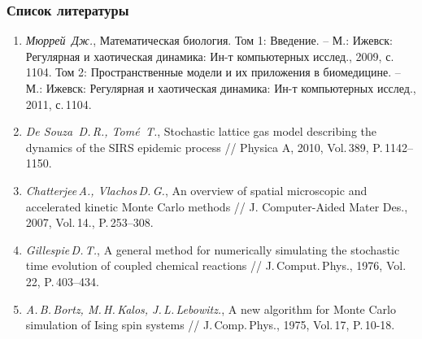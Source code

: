 \documentclass[
    11pt, %
    aspectratio=169, %
]{beamer}
\begin{document}
\begin{frame}
	\frametitle{Список литературы}
		
    \fontsize{10}{10}\selectfont{}

    \begin{enumerate}
        \item \textit{Мюррей \,Дж.}, Математическая биология. Том 1: Введение. – М.: Ижевск: Регулярная и хаотическая динамика: Ин-т компьютерных исслед., 2009, с.\,1104. Том 2: Пространственные модели и их приложения в биомедицине. – М.: Ижевск: Регулярная и хаотическая динамика: Ин-т компьютерных исслед., 2011, с.\,1104.
        \item \textit{De Souza \,D.\,R., Tomé \,T.}, Stochastic lattice gas model describing the dynamics of the SIRS epidemic process // Physica A, 2010, Vol.\,389, P.\,1142–1150.
        \item  \textit{Chatterjee\,A., Vlachos\,D.\,G.}, An overview of spatial microscopic and accelerated kinetic Monte Carlo methods // J. Computer-Aided Mater Des., 2007, Vol.\,14., P.\,253–308.
        \item \textit{Gillespie\,D.\,T.}, A general method for numerically simulating the stochastic time evolution of coupled chemical reactions // J.\,Comput.\,Phys., 1976, Vol.\,22, P.\,403–434.
        \item \textit{A.\,B.\,Bortz, M.\,H.\,Kalos, J.\,L.\,Lebowitz.}, A new algorithm for Monte Carlo simulation of Ising spin systems // J.\,Comp.\,Phys., 1975, Vol.\,17, P.\,10-18.
    \end{enumerate}
 
\end{frame}
\end{document}
